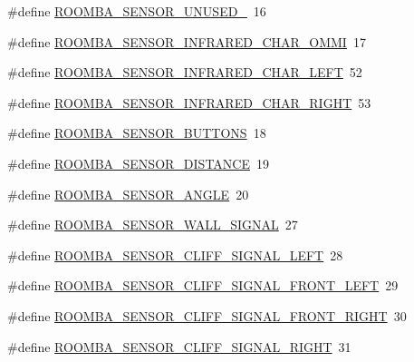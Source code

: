 \begin{DoxyCompactItemize}
\item 
\#define \hyperlink{group__roomba__sensor__extern_gafeaaaef2638094e3785fa4e1388b17f7}{R\-O\-O\-M\-B\-A\-\_\-\-S\-E\-N\-S\-O\-R\-\_\-\-U\-N\-U\-S\-E\-D\-\_}~16
\item 
\#define \hyperlink{group__roomba__sensor__extern_ga50e1d718f0d900d1eabaede5bf421ece}{R\-O\-O\-M\-B\-A\-\_\-\-S\-E\-N\-S\-O\-R\-\_\-\-I\-N\-F\-R\-A\-R\-E\-D\-\_\-\-C\-H\-A\-R\-\_\-\-O\-M\-M\-I}~17
\item 
\#define \hyperlink{group__roomba__sensor__extern_ga87e725b00eee9bdc973713630d69c44e}{R\-O\-O\-M\-B\-A\-\_\-\-S\-E\-N\-S\-O\-R\-\_\-\-I\-N\-F\-R\-A\-R\-E\-D\-\_\-\-C\-H\-A\-R\-\_\-\-L\-E\-F\-T}~52
\item 
\#define \hyperlink{group__roomba__sensor__extern_gaf772750454c0449f52f75c7a8b09e21e}{R\-O\-O\-M\-B\-A\-\_\-\-S\-E\-N\-S\-O\-R\-\_\-\-I\-N\-F\-R\-A\-R\-E\-D\-\_\-\-C\-H\-A\-R\-\_\-\-R\-I\-G\-H\-T}~53
\item 
\#define \hyperlink{group__roomba__sensor__extern_ga3fe82b1e1eacfd04e29a9ea7b5321ecb}{R\-O\-O\-M\-B\-A\-\_\-\-S\-E\-N\-S\-O\-R\-\_\-\-B\-U\-T\-T\-O\-N\-S}~18
\item 
\#define \hyperlink{group__roomba__sensor__extern_ga1cd3dfb38c53d1928f8621520f36987a}{R\-O\-O\-M\-B\-A\-\_\-\-S\-E\-N\-S\-O\-R\-\_\-\-D\-I\-S\-T\-A\-N\-C\-E}~19
\item 
\#define \hyperlink{group__roomba__sensor__extern_ga274b9e8c77f7e8cd8dde6e3626aa817c}{R\-O\-O\-M\-B\-A\-\_\-\-S\-E\-N\-S\-O\-R\-\_\-\-A\-N\-G\-L\-E}~20
\item 
\#define \hyperlink{group__roomba__sensor__extern_ga5ee227b54819dd7bda9c0ceae020894f}{R\-O\-O\-M\-B\-A\-\_\-\-S\-E\-N\-S\-O\-R\-\_\-\-W\-A\-L\-L\-\_\-\-S\-I\-G\-N\-A\-L}~27
\item 
\#define \hyperlink{group__roomba__sensor__extern_gadff44c6a461f2a29a0bcf4b4e5b9cbc9}{R\-O\-O\-M\-B\-A\-\_\-\-S\-E\-N\-S\-O\-R\-\_\-\-C\-L\-I\-F\-F\-\_\-\-S\-I\-G\-N\-A\-L\-\_\-\-L\-E\-F\-T}~28
\item 
\#define \hyperlink{group__roomba__sensor__extern_gab569695daa3b84987833ebbdcd7c515f}{R\-O\-O\-M\-B\-A\-\_\-\-S\-E\-N\-S\-O\-R\-\_\-\-C\-L\-I\-F\-F\-\_\-\-S\-I\-G\-N\-A\-L\-\_\-\-F\-R\-O\-N\-T\-\_\-\-L\-E\-F\-T}~29
\item 
\#define \hyperlink{group__roomba__sensor__extern_gaeca0c4a7481f53abf065e3e1fdf49663}{R\-O\-O\-M\-B\-A\-\_\-\-S\-E\-N\-S\-O\-R\-\_\-\-C\-L\-I\-F\-F\-\_\-\-S\-I\-G\-N\-A\-L\-\_\-\-F\-R\-O\-N\-T\-\_\-\-R\-I\-G\-H\-T}~30
\item 
\#define \hyperlink{group__roomba__sensor__extern_ga64201310b3c0ee4b5fa24ff8cf92106d}{R\-O\-O\-M\-B\-A\-\_\-\-S\-E\-N\-S\-O\-R\-\_\-\-C\-L\-I\-F\-F\-\_\-\-S\-I\-G\-N\-A\-L\-\_\-\-R\-I\-G\-H\-T}~31

\end{DoxyCompactItemize}

